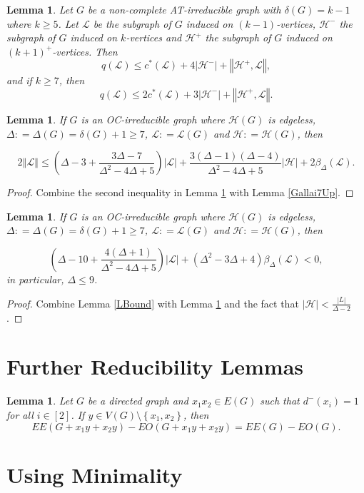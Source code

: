 \documentclass[12pt]{article}
\theoremstyle{plain}
\newtheorem{lem}[thm]{Lemma}
\theoremstyle{definition}
\theoremstyle{remark}
\newcommand{\fancy}[1]{\mathcal{#1}}
\renewcommand{\L}{\fancy{L}}
\newcommand{\HH}{\fancy{H}}
\newcommand{\set}[1]{\left\{ #1 \right\}}
\newcommand{\card}[1]{\left|#1\right|}
\newcommand{\size}[1]{\left\Vert#1\right\Vert}
\newcommand{\irange}[1]{\left[#1\right]}
\newcommand{\parens}[1]{\left( #1 \right)}
\newcommand{\DefinedAs}{\mathrel{\mathop:}=}
\begin{document}
\begin{lem}\label{qLemma}
	Let $G$ be a non-complete AT-irreducible graph with $\delta(G) = k-1$ where $k \ge 5$.  Let $\L$ be the subgraph of $G$ induced on $(k-1)$-vertices, $\HH^-$ the subgraph of $G$ induced on $k$-vertices and 
	$\HH^+$ the subgraph of $G$ induced on $(k+1)^+$-vertices.  Then
	\[q(\L) \le c^*(\L) + 4\card{\HH^-} + \size{\HH^+, \L},\] and if $k \ge 7$, then
	\[q(\L) \le 2c^*(\L) + 3\card{\HH^-} + \size{\HH^+, \L}.\]
\end{lem}

\begin{lem}\label{QuaBound}
If $G$ is an OC-irreducible graph where $\HH(G)$ is edgeless, $\Delta \DefinedAs \Delta(G) = \delta(G) + 1 \ge 7$, $\L\DefinedAs\L(G)$ and $\HH \DefinedAs \HH(G)$, then

\[2\size{\L} \le \parens{\Delta-3 + \frac{3\Delta-7}{\Delta^2-4\Delta+5}}\card{\L} + \frac{3(\Delta-1)(\Delta-4)}{\Delta^2-4\Delta+5}\card{\HH} +  2\beta_{\Delta}(\L).\]
\end{lem}
\begin{proof}
Combine the second inequality in Lemma \ref{qLemma} with Lemma \ref{Gallai7Up}.
\end{proof}

\begin{lem}
If $G$ is an OC-irreducible graph where $\HH(G)$ is edgeless, $\Delta \DefinedAs \Delta(G) = \delta(G) + 1 \ge 7$, $\L\DefinedAs\L(G)$ and $\HH \DefinedAs \HH(G)$, then

\[\parens{\Delta-10 + \frac{4(\Delta+1)}{\Delta^2-4\Delta+5}}\card{\L} + \parens{\Delta^2-3\Delta+4}\beta_{\Delta}(\L)< 0,\]
in particular, $\Delta \le 9$.
\end{lem}
\begin{proof}
Combine Lemma \ref{LBound} with Lemma \ref{QuaBound} and the fact that $\card{\HH} < \frac{\card{L}}{\Delta-2}$.
\end{proof}

\section{Further Reducibility Lemmas}
\begin{lem}\label{RootLemma}
Let $G$ be a directed graph and $x_1x_2 \in E(G)$ such that $d^-(x_i) = 1$ for all $i\in \irange{2}$.  If $y \in V(G) \setminus \set{x_1,x_2}$, then
\[EE(G + x_1y + x_2y)-EO(G + x_1y + x_2y) = EE(G) - EO(G).\]
\end{lem}

\section{Using Minimality}
\end{document}
